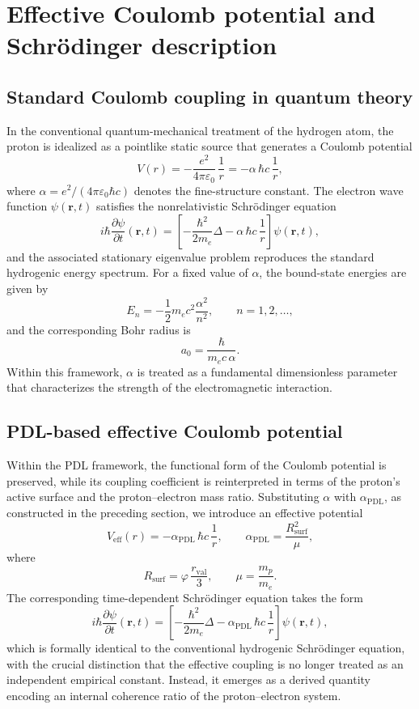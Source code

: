 \documentclass[12pt,a4paper]{article}
\begin{document}
\section{Effective Coulomb potential and Schr\"odinger description}

\subsection{Standard Coulomb coupling in quantum theory}

In the conventional quantum-mechanical treatment of the hydrogen atom, the proton is idealized as a pointlike static source that generates a Coulomb potential
\[
  V(r)
  =
  -\frac{e^2}{4\pi\varepsilon_0}\,\frac{1}{r}
  =
  -\alpha\,\hbar c\,\frac{1}{r},
\]
where \(\alpha = e^2/(4\pi\varepsilon_0\hbar c)\) denotes the fine-structure constant.
The electron wave function \(\psi(\mathbf{r},t)\) satisfies the nonrelativistic Schr\"odinger equation
\[
  i\hbar \frac{\partial \psi}{\partial t}(\mathbf{r},t)
  =
  \left[
    -\frac{\hbar^2}{2m_e}\Delta
    -\alpha\,\hbar c\,\frac{1}{r}
  \right]\psi(\mathbf{r},t),
\]
and the associated stationary eigenvalue problem reproduces the standard hydrogenic energy spectrum.
For a fixed value of \(\alpha\), the bound-state energies are given by
\[
  E_n
  =
  -\frac{1}{2}m_e c^2 \frac{\alpha^2}{n^2},
  \qquad
  n = 1,2,\dots,
\]
and the corresponding Bohr radius is
\[
  a_0 = \frac{\hbar}{m_e c\,\alpha}.
\]
Within this framework, \(\alpha\) is treated as a fundamental dimensionless parameter that characterizes the strength of the electromagnetic interaction.

\subsection{PDL-based effective Coulomb potential}

Within the PDL framework, the functional form of the Coulomb potential is preserved, while its coupling coefficient is reinterpreted in terms of the proton’s active surface and the proton–electron mass ratio. Substituting \(\alpha\) with \(\alpha_{\text{PDL}}\), as constructed in the preceding section, we introduce an effective potential
\[
  V_{\text{eff}}(r)
  =
  -\alpha_{\text{PDL}}\,\hbar c\,\frac{1}{r},
  \qquad
  \alpha_{\text{PDL}}
  =
  \frac{R_{\text{surf}}^2}{\mu},
\]
where
\[
  R_{\text{surf}} = \varphi\,\frac{r_{\text{val}}}{3},
  \qquad
  \mu = \frac{m_p}{m_e}.
\]
The corresponding time-dependent Schr\"odinger equation takes the form
\[
  i\hbar \frac{\partial \psi}{\partial t}(\mathbf{r},t)
  =
  \left[
    -\frac{\hbar^2}{2m_e}\Delta
    -\alpha_{\text{PDL}}\,\hbar c\,\frac{1}{r}
  \right]\psi(\mathbf{r},t),
\]
which is formally identical to the conventional hydrogenic Schr\"odinger equation, with the crucial distinction that the effective coupling is no longer treated as an independent empirical constant. Instead, it emerges as a derived quantity encoding an internal coherence ratio of the proton–electron system.\cite{Laubscher2026PDL_English,Laubscher2026LDP_French}
\end{document}

